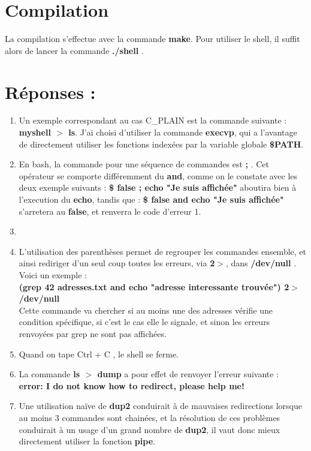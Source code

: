 \documentclass[10pt,a4paper]{article}
\begin{document}
\section{Compilation}
La compilation s'effectue avec la commande \textbf{make}. Pour utiliser le shell, il suffit alors de lancer la commande \textbf{./shell} .

\section{Réponses :}
\begin{enumerate}
	\item Un exemple correspondant au cas C\_PLAIN est la commande suivante : \textbf{myshell $>$ ls}. J'ai choisi d'utiliser la commande \textbf{execvp}, qui a l'avantage de directement utiliser les fonctions indexées par la variable globale \textbf{\$PATH}.
	\item En bash, la commande pour une séquence de commandes est \textbf{;} . Cet opérateur se comporte différemment du \textbf{and}, comme on le constate avec les deux exemple suivants : \textbf{\$ false ; echo "Je suis affichée"} aboutira bien à l'execution du \textbf{echo}, tandis que : \textbf{\$ false and echo "Je suis affichée"} s'arretera au \textbf{false}, et renverra le code d'erreur 1.
	\item \
	\item L'utilisation des parenthèses permet de regrouper les commandes ensemble, et ainsi rediriger d'un seul coup toutes les erreurs, via \textbf{2$>$}, dans \textbf{/dev/null} . Voici un exemple : 
	\\ \textbf{ (grep 42 adresses.txt and echo "adresse interessante trouvée") 2$>$ /dev/null }
	\\ Cette commande va chercher si au moins une des adresses vérifie une condition spécifique, si c'est le cas elle le signale, et sinon les erreurs renvoyées par grep ne sont pas affichées.
	\item Quand on tape Ctrl + C , le shell se ferme.
	\item La commande \textbf{ls $>$ dump} a pour effet de renvoyer l'erreur suivante : \\ \textbf{error: I do not know how to redirect, please help me!}
	\item Une utilisation naïve de \textbf{dup2} conduirait à de mauvaises redirections lorsque au moins 3 commandes sont chainées, et la résolution de ces problèmes conduirait à un usage d'un grand nombre de \textbf{dup2}, il vaut donc mieux directement utiliser la fonction \textbf{pipe}.
\end{enumerate}
\end{document}
